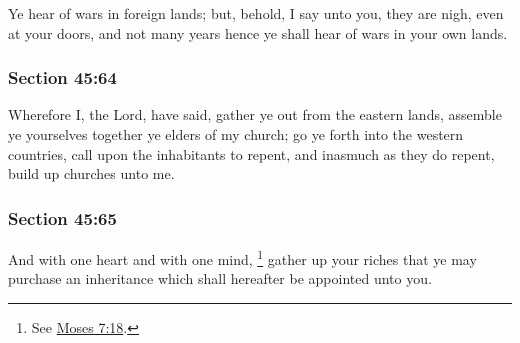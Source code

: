 		Ye hear of wars in foreign lands; but, behold, I say unto you, they are nigh, even at your doors, and not many years hence ye shall hear of wars in your own lands.


	\subsubsection{Section 45:64} %
		\label{DC45-64}

		Wherefore I, the Lord, have said, gather ye out from the eastern lands, assemble ye yourselves together ye elders of my church; go ye forth into the western countries, call upon the inhabitants to repent, and inasmuch as they do repent, build up churches unto me.


	\subsubsection{Section 45:65} %
		\label{DC45-65}

		And with one heart and with one mind,%
			\footnote{%
				See \hyperref[MOSES-7-18]{Moses 7:18}.
				}
		gather up your riches that ye may purchase an inheritance which shall hereafter be appointed unto you.


